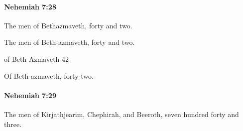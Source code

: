 		\paragraph{Nehemiah 7:28} %
			\label{NEHEMIAH-7-28}

			The men of Bethazmaveth, forty and two.

			\begin{versebox}
					\item[BHS] 
					\item[LXX] 
					\item[ASV] The men of Beth-azmaveth, forty and two.
					\item[NIV] of Beth Azmaveth 42
					\item[NRSV] Of Beth-azmaveth, forty-two.
			\end{versebox}

		\paragraph{Nehemiah 7:29} %
			\label{NEHEMIAH-7-29}

			The men of Kirjathjearim, Chephirah, and Beeroth, seven hundred forty and three.

